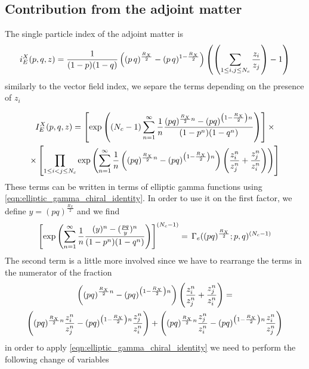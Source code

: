 \begin{appendices}
\subsection{Contribution from the adjoint matter}
The single particle index of the adjoint matter is
\begin{equation}
	i_E^{X}(p,q,z) = {1 \over (1-p)(1-q)}
	\left((p\,q)^{\frac{R_X}{2}}- (p\,q)^{1-\frac{R_X}{2}}\right) \left( \left(  \sum_{ 1 \leq i,j \leq N_c}  {z_i\over z_j}  \right)- 1 \right)
\end{equation}
similarly to the vector field index, we separe the terms depending on the presence of $z_i$

\begin{multline}
I_E^X(p,q,z) = 
\left[ \exp \left( (N_c -1) \sum_{n=1}^{\infty} {1 \over n}  \frac{ (pq)^{{\frac{R_X}{2}}n} - (pq)^{\left(1-{\frac{R_X}{2}} \right ) n}}{(1-p^n)(1-q^n)} \right) \right] \times
  \\
\times \left[  \prod_{ 1 \leq i < j \leq N_c} 
\exp \left(\sum_{n=1}^{\infty} {1 \over n}
\left ((pq)^{\frac{R_X}{2} n} - (pq)^{\left(1-\frac{R_X}{2} \right)n} \right) \left ( {z_i^n\over z_j^n} + { z_j^n \over z_i^n} \right) \right)
\right]
\end{multline}
These terms can be written in terms of elliptic gamma functions using \eqref{eqn:elliptic_gamma_chiral_identity}.
In order to use it on the first factor, we define $ y= (pq)^{\frac{R_X}{2}}$ and we find
\begin{equation}
\left[ \exp \left(  \sum_{n=1}^{\infty} {1 \over n}  \frac{ (y)^{n} - ({pq \over y})^{n}}{(1-p^n)(1-q^n)} \right)\right]^{(N_c-1)}
=
\,
\Gamma_e ( (pq)^{\frac{R_X}{2}}; p,q)^{(N_c-1)}
\end{equation}
The second term is a little more involved since we have to rearrange the terms in the numerator of the fraction
\begin{multline}
 \left ( \left (p q \right)^{\frac{R_X}{2} n} - (pq)^{\left( 1-\frac{R_X}{2} \right) n} \right) \left ( {z_i^n\over z_j^n} + { z_j^n \over z_i^n} \right)  = \\
 \left(  (pq)^{\frac{R_X}{2} n} {z_i^n\over z_j^n} - (pq)^{\left( 1-\frac{R_X}{2} \right) n}{ z_j^n \over z_i^n} \right)  + \left(  (pq)^{\frac{R_X}{2} n} { z_j^n \over z_i^n} - (pq)^{\left (1-\frac{R_X}{2} \right )n}{z_i^n\over z_j^n} \right)
\end{multline}
in order to apply \eqref{eqn:elliptic_gamma_chiral_identity} we need to perform the following change of variables 
\begin{equation}

\end{equation}
\end{appendices}
